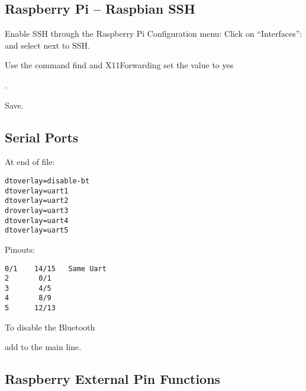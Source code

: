 \subsection{Raspberry Pi -- Raspbian SSH}

Enable SSH through the Raspberry Pi Configuration menu:
 Click on ``Interfaces'':
and select  next to SSH.

Use the command  find
and X11Forwarding set the value to yes 

.

Save.



\subsection{Serial Ports}

At end of file:

\begingroup \fontsize{10pt}{10pt}
\selectfont
\begin{verbatim} 
dtoverlay=disable-bt
dtoverlay=uart1
dtoverlay=uart2
droverlay=uart3
dtoverlay=uart4
dtoverlay=uart5
\end{verbatim}
\endgroup

Pinouts:

\begingroup \fontsize{10pt}{10pt}
\selectfont
\begin{verbatim} 
0/1    14/15   Same Uart
2       0/1
3       4/5
4       8/9
5      12/13
\end{verbatim}
\endgroup


To disable the Bluetooth 



add  to the main line.

\newpage
\subsection{Raspberry External Pin Functions}

